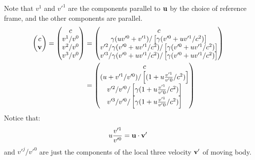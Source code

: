 \documentclass[12pt,a4]{article}
\begin{document}
\begin{enumerate}
\begin{enumerate}
        Note that $v^1$ and $v'^1$ are the components parallel to ${\bf u}$ by the choice of reference frame, and the other components are parallel.
        \begin{align*}
                \left(\begin{matrix}
                    c   \\
                    {\bf v}   
                  \end{matrix}\right)
            =       
                  \left(\begin{matrix}
                    c   \\
                    v^1/v^0    \\
                    v^2/v^0   \\
                    v^3/v^0
                  \end{matrix}\right)
            &=              \left(\begin{matrix}
                                c \\ 
                                \gamma (u v'^0 + v'^1)/\left[ \gamma (v'^0   + u v'^1/ c^2)\right]   \\ 
                                v'^2 / \gamma (v'^0   + u v'^1/ c^2)/\left[ \gamma (v'^0   + u v'^1/ c^2)\right]              \\ 
                                v'^3 / \gamma (v'^0   + u v'^1/ c^2)/\left[ \gamma (v'^0   + u v'^1/ c^2)\right]
                            \end{matrix}\right)\\
            &=              \left(\begin{matrix}
                                c \\ 
                                (u  + v'^1/v'^0)/\left[ (1  + u \frac{v'^1}{v'0}/ c^2)\right]   \\ 
                                v'^2 /v'^0/\left[ \gamma (1   + u \frac{v'^1}{v'0}/ c^2)\right]              \\ 
                                v'^3 /v'^0/\left[ \gamma (1   + u \frac{v'^1}{v'0}/ c^2)\right]
                            \end{matrix}\right)\\
        \end{align*}
        Notice that:
        \begin{equation*}
          u \frac{v'^1}{v'^0} = {\bf u} \cdot {\bf v}'
        \end{equation*}
        and $v'^j/v'^0$ are just the components of the local three velocity ${\bf v}'$ of moving body.

\end{enumerate}
\end{enumerate}
\end{document}
